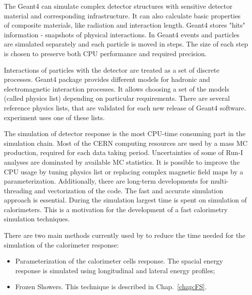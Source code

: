 The Geant4 can simulate complex detector structures with sensitive detector material and corresponding infrastructure. It can also calculate basic properties of composite materials, like radiation and interaction length. Geant4 stores "hits" information  - snapshots of physical interactions. 
In Geant4 events and particles are simulated separately and each particle is moved in steps. The size of each step is chosen to preserve both CPU performance and required precision. 

Interactions of particles with the detector are treated as a set of discrete processes. Geant4 package provides different models for hadronic and electromagnetic interaction processes. It allows choosing a set of the models (called physics list) depending on particular requirements. There are several reference physics lists, that are validated for each new release of Geant4 software. \atlas experiment uses one of these lists.

The simulation of detector response is the most CPU-time consuming part in the \atlas simulation chain. Most of the CERN computing resources are used by a mass MC production, required for each data taking period. Uncertainties of some of Run-I analyses are dominated by available MC statistics. It is possible to improve the CPU usage by tuning physics list or replacing complex magnetic field maps by a parameterization. Additionally, there are long-term developments for multi-threading and vectorization of the code.  The fast and accurate simulation approach is essential. During the simulation largest time is spent on simulation of calorimeters. This is a motivation for the development of a fast calorimetry simulation techniques.  

There are two main methods currently used by \atlas to reduce the time needed for the simulation of the calorimeter response\cite{Lukas:1458503}: 
\begin{itemize}
\item Parameterization of the calorimeter cells response. The spacial energy response is simulated using longitudinal and lateral energy profiles;
\item Frozen Showers. This technique is described in Chap.~\ref{chap:FS}.
\end{itemize}

